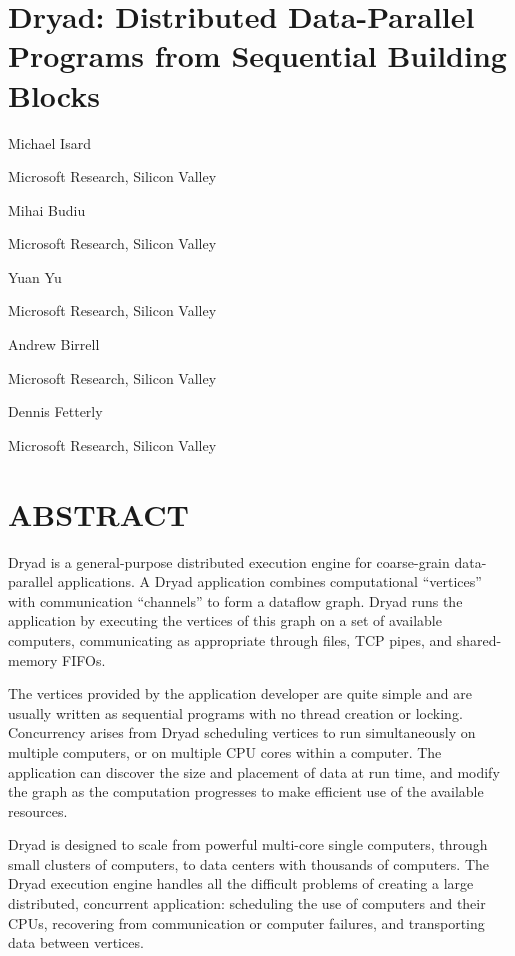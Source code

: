 \documentclass[
]{article}
\author{}
\date{}
\begin{document}
\section{Dryad: Distributed Data-Parallel Programs from Sequential
Building
Blocks}\label{dryad-distributed-data-parallel-programs-from-sequential-building-blocks}

Michael Isard

Microsoft Research, Silicon Valley

Mihai Budiu

Microsoft Research, Silicon Valley

Yuan Yu

Microsoft Research, Silicon Valley

Andrew Birrell

Microsoft Research, Silicon Valley

Dennis Fetterly

Microsoft Research, Silicon Valley

\section{ABSTRACT}\label{abstract}

Dryad is a general-purpose distributed execution engine for coarse-grain
data-parallel applications. A Dryad application combines computational
``vertices'' with communication ``channels'' to form a dataflow graph.
Dryad runs the application by executing the vertices of this graph on a
set of available computers, communicating as appropriate through files,
TCP pipes, and shared-memory FIFOs.

The vertices provided by the application developer are quite simple and
are usually written as sequential programs with no thread creation or
locking. Concurrency arises from Dryad scheduling vertices to run
simultaneously on multiple computers, or on multiple CPU cores within a
computer. The application can discover the size and placement of data at
run time, and modify the graph as the computation progresses to make
efficient use of the available resources.

Dryad is designed to scale from powerful multi-core single computers,
through small clusters of computers, to data centers with thousands of
computers. The Dryad execution engine handles all the difficult problems
of creating a large distributed, concurrent application: scheduling the
use of computers and their CPUs, recovering from communication or
computer failures, and transporting data between vertices.
\end{document}
